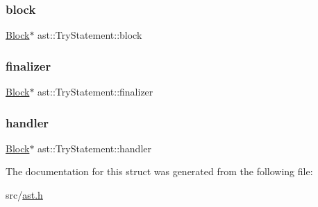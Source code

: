 \subsubsection{\texorpdfstring{block}{block}}
{\footnotesize\ttfamily \hyperlink{structast_1_1_block}{Block}$\ast$ ast\+::\+Try\+Statement\+::block}

\mbox{\label{structast_1_1_try_statement_acecb6d1fa205b73259356faf86aab0fc}} 
\subsubsection{\texorpdfstring{finalizer}{finalizer}}
{\footnotesize\ttfamily \hyperlink{structast_1_1_block}{Block}$\ast$ ast\+::\+Try\+Statement\+::finalizer}

\mbox{\label{structast_1_1_try_statement_ada67f3060d470890aece707687ed0690}} 
\subsubsection{\texorpdfstring{handler}{handler}}
{\footnotesize\ttfamily \hyperlink{structast_1_1_block}{Block}$\ast$ ast\+::\+Try\+Statement\+::handler}



The documentation for this struct was generated from the following file\+:\begin{DoxyCompactItemize}
\item 
src/\hyperlink{ast_8h}{ast.\+h}\end{DoxyCompactItemize}
